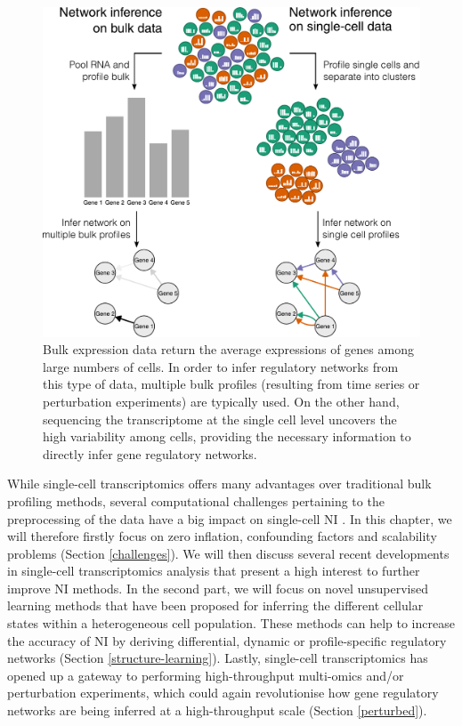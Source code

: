 \begin{figure}
	\centering
	\includegraphics[width=\Largefigure]{fig/introduction/ni_bulk_vs_sc}
	\caption{Bulk expression data return the average expressions of genes among large numbers of cells. In order to infer regulatory networks from this type of data, multiple bulk profiles (resulting from time series or perturbation experiments) are typically used. On the other hand, sequencing the transcriptome at the single cell level uncovers the high variability among cells, providing the necessary information to directly infer gene regulatory networks.}
	\label{fig:bulk_vs_singlecell}
\end{figure}


While single-cell transcriptomics offers many advantages over traditional bulk profiling methods,
several computational challenges pertaining to the preprocessing of the data have a big impact on 
single-cell NI \cite{Stegle2015ComputationalChallenges}.  In this chapter, we will therefore firstly focus on zero inflation, confounding factors and scalability problems (Section \ref{challenges}).
We will then discuss several recent developments in single-cell transcriptomics analysis that present a high interest to further improve NI methods. In the second part, we will focus on novel unsupervised learning methods that have been proposed for inferring the different cellular states within a heterogeneous cell population. These methods can help to increase the accuracy of NI by deriving differential, dynamic or profile-specific regulatory networks (Section \ref{structure-learning}).
Lastly, single-cell transcriptomics has opened up a gateway to performing high-throughput multi-omics and/or perturbation experiments, which could again revolutionise how gene regulatory networks are being inferred at a high-throughput scale (Section \ref{perturbed}).



